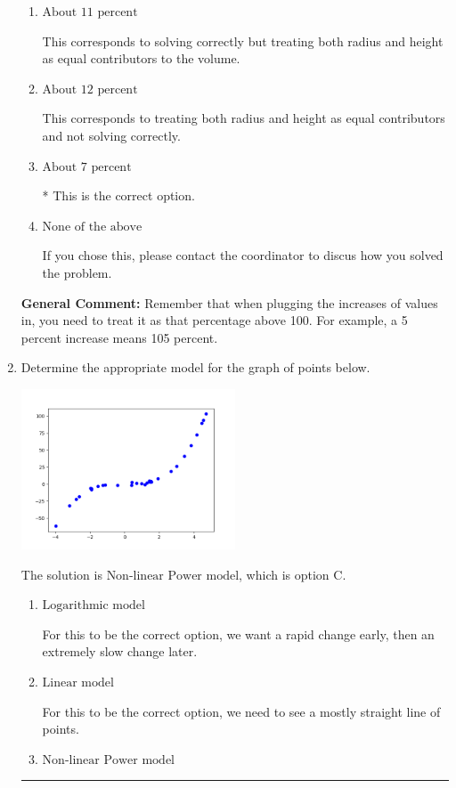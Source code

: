 \documentclass{extbook}[14pt]
\newcommand{\litem}[1]{\item #1

\rule{\textwidth}{0.4pt}}
\begin{document}
\begin{enumerate}
{\begin{enumerate}[label=\Alph*.]
This corresponds to not solving for the increase properly.
\item \( \text{About } 11 \text{ percent} \)

This corresponds to solving correctly but treating both radius and height as equal contributors to the volume.
\item \( \text{About } 12 \text{ percent} \)

This corresponds to treating both radius and height as equal contributors and not solving correctly.
\item \( \text{About } 7 \text{ percent} \)

* This is the correct option.
\item \( \text{None of the above} \)

If you chose this, please contact the coordinator to discus how you solved the problem.
\end{enumerate}

\textbf{General Comment:} Remember that when plugging the increases of values in, you need to treat it as that percentage above 100. For example, a 5 percent increase means 105 percent.
}
\litem{
Determine the appropriate model for the graph of points below.

\begin{center}
    \includegraphics[width=0.5\textwidth]{../Figures/identifyModelGraph12C.png}
\end{center}


The solution is \( \text{Non-linear Power model} \), which is option C.\begin{enumerate}[label=\Alph*.]
\item \( \text{Logarithmic model} \)

For this to be the correct option, we want a rapid change early, then an extremely slow change later.
\item \( \text{Linear model} \)

For this to be the correct option, we need to see a mostly straight line of points.
\item \( \text{Non-linear Power model} \)


\end{enumerate}}
\end{enumerate}
\end{document}
